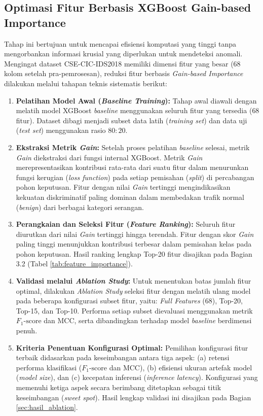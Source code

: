 \documentclass[11pt, a4paper]{article}
\begin{document}
\subsection{Optimasi Fitur Berbasis XGBoost Gain-based Importance}
Tahap ini bertujuan untuk mencapai efisiensi komputasi yang tinggi tanpa mengorbankan informasi krusial yang diperlukan untuk mendeteksi anomali. Mengingat dataset CSE-CIC-IDS2018 memiliki dimensi fitur yang besar (68 kolom setelah pra-pemrosesan), reduksi fitur berbasis \textit{Gain-based Importance} \cite{ref_xgboost} dilakukan melalui tahapan teknis sistematis berikut:

\begin{enumerate}
    \item \textbf{Pelatihan Model Awal (\textit{Baseline Training}):} Tahap awal diawali dengan melatih model XGBoost \cite{ref_xgboost} \textit{baseline} menggunakan seluruh fitur yang tersedia ($68$ fitur). Dataset dibagi menjadi subset data latih (\textit{training set}) dan data uji (\textit{test set}) menggunakan rasio $80:20$.
    
    \item \textbf{Ekstraksi Metrik \textit{Gain}:} Setelah proses pelatihan \textit{baseline} selesai, metrik \textit{Gain} diekstraksi dari fungsi internal XGBoost. Metrik \textit{Gain} merepresentasikan kontribusi rata-rata dari suatu fitur dalam menurunkan fungsi kerugian (\textit{loss function}) pada setiap pemisahan (\textit{split}) di percabangan pohon keputusan. Fitur dengan nilai \textit{Gain} tertinggi mengindikasikan kekuatan diskriminatif paling dominan dalam membedakan trafik normal (\textit{benign}) dari berbagai kategori serangan.
    
    \item \textbf{Perangkaian dan Seleksi Fitur (\textit{Feature Ranking}):} Seluruh fitur diurutkan dari nilai \textit{Gain} tertinggi hingga terendah. Fitur dengan skor \textit{Gain} paling tinggi menunjukkan kontribusi terbesar dalam pemisahan kelas pada pohon keputusan. Hasil ranking lengkap Top-20 fitur disajikan pada Bagian 3.2 (Tabel \ref{tab:feature_importance}).

    \item \textbf{Validasi melalui \textit{Ablation Study}:} Untuk menentukan batas jumlah fitur optimal, dilakukan \textit{Ablation Study} seleksi fitur dengan melatih ulang model pada beberapa konfigurasi subset fitur, yaitu: \textit{Full Features} (68), Top-20, Top-15, dan Top-10. Performa setiap subset dievaluasi menggunakan metrik $F_1\text{-score}$ dan MCC, serta dibandingkan terhadap model \textit{baseline} berdimensi penuh.
    
    \item \textbf{Kriteria Penentuan Konfigurasi Optimal:} Pemilihan konfigurasi fitur terbaik didasarkan pada keseimbangan antara tiga aspek: (a) retensi performa klasifikasi ($F_1\text{-score}$ dan MCC), (b) efisiensi ukuran artefak model (\textit{model size}), dan (c) kecepatan inferensi (\textit{inference latency}). Konfigurasi yang memenuhi ketiga aspek secara berimbang ditetapkan sebagai titik keseimbangan (\textit{sweet spot}). Hasil lengkap validasi ini disajikan pada Bagian \ref{sec:hasil_ablation}.
\end{enumerate}
\end{document}

